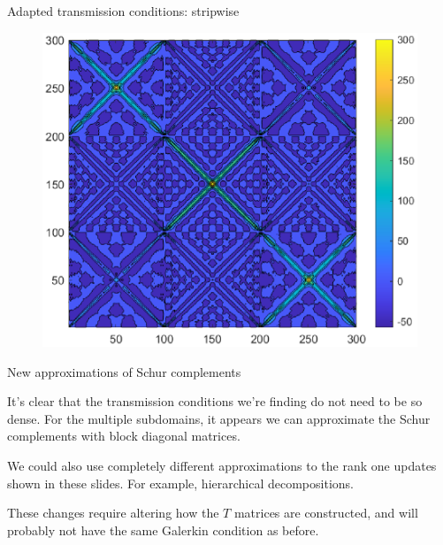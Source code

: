 \documentclass{beamer}
\begin{document}
\begin{frame}{Adapted transmission conditions: stripwise}
\begin{figure}
	\centering
	\includegraphics[width=\textwidth]{AOSM/PLOT_RedBlack_T_Seminar3.eps}
\end{figure}
\end{frame}

\begin{frame}{New approximations of Schur complements}

It's clear that the transmission conditions we're finding do not need to be so dense.
For the multiple subdomains, it appears we can approximate the Schur complements with block diagonal matrices.

We could also use completely different approximations to the rank one updates shown in these slides.
For example, hierarchical decompositions.

These changes require altering how the $T$ matrices are constructed, and will probably not have the same Galerkin condition as before.
\end{frame}
\end{document}
